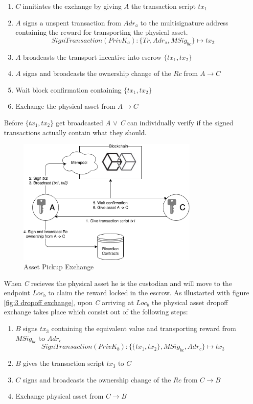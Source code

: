 \begin{enumerate}
  \item $C$ innitiates the exchange by giving $A$ the transaction script $tx_1$
  \item $A$ signs a unspent transaction from $Adr_a$ to the multisignature address containing the reward for transporting the physical asset. \[SignTransaction(PrivK_a)\colon\{Tr, Adr_a, MSig_{bc}\}\mapsto tx_2\]
  \item $A$ broadcasts the transport incentive into escrow $\{tx_1, tx_2\}$
  \item $A$ signs and broadcasts the ownership change of the $Rc$ from $A\rightarrow C$
  \item Wait block confirmation containing $\{tx_1, tx_2\}$
  \item Exchange the physical asset from $A\rightarrow C$
\end{enumerate}

Before $\{tx_1, tx_2\}$ get broadcasted \textit{A $\lor$ C} can individually verify if the signed transactions actually contain what they should.

\begin{figure}[h]
\centering
\includegraphics[width=0.8\textwidth]{images/exchange_01.png}
\caption{Asset Pickup Exchange}
\label{fig:2 first exchange}
\end{figure}

 When \textit{C} recieves the physical asset he is the custodian and will move to the endpoint $Loc_b$ to claim the reward locked in the escrow. As illustarted with figure \ref{fig:3 dropoff exchange}, upon \textit{C} arriving at $Loc_b$ the physical asset dropoff exchange takes place which consist out of the following steps:

\begin{enumerate}
  \item $B$ signs $tx_3$ containing the equivalent value and transporting reward from $MSig_{bc}$ to $Adr_c$
  \[SignTransaction(PrivK_b)\colon\{\{tx_1, tx_2\}, MSig_{bc}, Adr_c\}\mapsto tx_3\]
  \item $B$ gives the transaction script $tx_3$ to $C$
  \item $C$ signs and broadcasts the ownership change of the $Rc$ from $C\rightarrow B$
  \item Exchange physical asset from $C\rightarrow B$
\end{enumerate}

